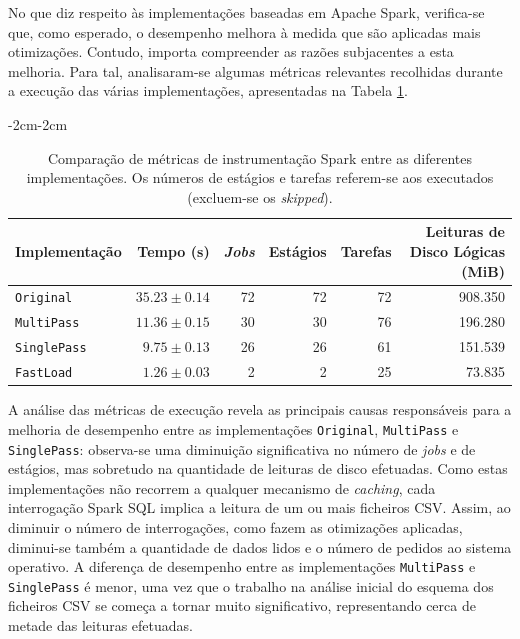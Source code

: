 \documentclass[11pt, a4paper]{article}
\begin{document}
No que diz respeito às implementações baseadas em Apache Spark, verifica-se que, como esperado, o
desempenho melhora à medida que são aplicadas mais otimizações. Contudo, importa compreender as
razões subjacentes a esta melhoria. Para tal, analisaram-se algumas métricas relevantes recolhidas
durante a execução das várias implementações, apresentadas na Tabela \ref{spark-metrics}.

\begin{table}[H]
    \begin{adjustwidth}{-2cm}{-2cm}
        \centering
        \begin{tabular}{|l|r|r|r|r|r|}
            \hline
            \textbf{Implementação}                   &
            \textbf{Tempo (s)}                       &
            \textbf{\emph{Jobs}}                     &
            \textbf{Estágios}                        &
            \textbf{Tarefas}                         &
            \textbf{Leituras de Disco Lógicas (MiB)} \\ \hline

            \texttt{Original}   & $35.23 \pm 0.14$ & 72 & 72 & 72 & 908.350 \\
            \texttt{MultiPass}  & $11.36 \pm 0.15$ & 30 & 30 & 76 & 196.280 \\
            \texttt{SinglePass} &  $9.75 \pm 0.13$ & 26 & 26 & 61 & 151.539 \\
            \texttt{FastLoad}   &  $1.26 \pm 0.03$ &  2 &  2 & 25 &  73.835 \\ \hline
        \end{tabular}
    \end{adjustwidth}

    \caption{
        \onehalfspacing
        Comparação de métricas de instrumentação Spark entre as diferentes implementações. Os
        números de estágios e tarefas referem-se aos executados (excluem-se os \emph{skipped}).
    }
    \label{spark-metrics}
\end{table}

A análise das métricas de execução revela as principais causas responsáveis para a melhoria de
desempenho entre as implementações \texttt{Original}, \texttt{MultiPass} e \texttt{SinglePass}:
observa-se uma diminuição significativa no número de \emph{jobs} e de estágios, mas sobretudo na
quantidade de leituras de disco efetuadas. Como estas implementações não recorrem a qualquer
mecanismo de \emph{caching}, cada interrogação Spark SQL implica a leitura de um ou mais ficheiros
CSV. Assim, ao diminuir o número de interrogações, como fazem as otimizações aplicadas, diminui-se
também a quantidade de dados lidos e o número de pedidos ao sistema operativo. A diferença de
desempenho entre as implementações \texttt{MultiPass} e \texttt{SinglePass} é menor, uma vez que o
trabalho na análise inicial do esquema dos ficheiros CSV se começa a tornar muito significativo,
representando cerca de metade das leituras efetuadas.
\end{document}
